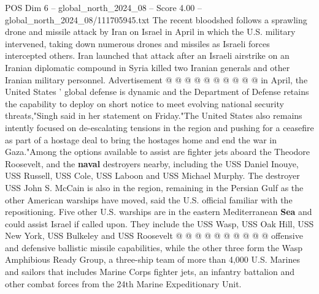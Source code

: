 \begin{textsample}{POS Dim 6 – global\_north\_2024\_08 – Score 4.00 – global\_north\_2024\_08/111705945.txt}
The recent bloodshed follows a sprawling drone and missile attack by Iran on Israel in April in which the U.S. military intervened, taking down numerous drones and missiles as Israeli forces intercepted others.
Iran launched that attack after an Israeli airstrike on an Iranian diplomatic compound in Syria killed two Iranian generals and other Iranian military personnel.
Advertisement @ @ @ @ @ @ @ @ @ @ in April, the United States ' global defense is dynamic and the Department of Defense retains the capability to deploy on short notice to meet evolving national security threats,"Singh said in her statement on Friday."The United States also remains intently focused on de-escalating tensions in the region and pushing for a ceasefire as part of a hostage deal to bring the hostages home and end the war in Gaza."Among the options available to assist are fighter jets aboard the Theodore Roosevelt, and the \textbf{naval} destroyers nearby, including the USS Daniel Inouye, USS Russell, USS Cole, USS Laboon and USS Michael Murphy.
The destroyer USS John S.
McCain is also in the region, remaining in the Persian Gulf as the other American warships have moved, said the U.S. official familiar with the repositioning.
Five other U.S. warships are in the eastern Mediterranean \textbf{Sea} and could assist Israel if called upon.
They include the USS Wasp, USS Oak Hill, USS New York, USS Bulkeley and USS Roosevelt @ @ @ @ @ @ @ @ @ @ offensive and defensive ballistic missile capabilities, while the other three form the Wasp Amphibious Ready Group, a three-ship team of more than 4,000 U.S.
Marines and sailors that includes Marine Corps fighter jets, an infantry battalion and other combat forces from the 24th Marine Expeditionary Unit.

\end{textsample}
